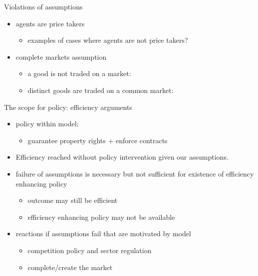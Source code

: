 \documentclass[bigger]{beamer}
\begin{document}
\begin{frame}[label={sec:orgb1576ee}]{Violations of assumptions}
\begin{itemize}
\item agents are price takers
\begin{itemize}
\item examples of cases where agents are not price takers?
\vspace*{1cm}
\end{itemize}
\item complete markets assumption
\begin{itemize}
\item a good is not traded on a market:
\vspace*{1cm}
\item distinct goods are traded on a common market:
\vspace*{1cm}
\end{itemize}
\end{itemize}
\end{frame}
\begin{frame}[label={sec:orgb8a0ae6}]{The scope for policy: efficiency arguments}
\begin{itemize}
\item policy within model:
\begin{itemize}
\item guarantee property rights + enforce contracts
\end{itemize}
\item Efficiency reached without policy intervention given our assumptions.
\item failure of assumptions is necessary but not sufficient for existence of efficiency enhancing policy
\begin{itemize}
\item outcome may still be efficient
\item efficiency enhancing policy may not be available
\end{itemize}
\item reactions if assumptions fail that are motivated by model
\begin{itemize}
\item competition policy and sector regulation
\item complete/create the market
\end{itemize}
\end{itemize}
\end{frame}
\end{document}
